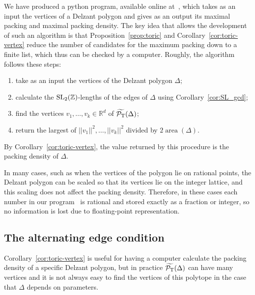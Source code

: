 \documentclass[pdftex]{sigma}
\numberwithin{equation}{section}
\def\R{{\mathbb R}}
\def\Z{{\mathbb Z}}
\newcommand{\De}{\Delta}
\newcommand{\area}{\operatorname{area}}
\newcommand{\PT}{\mathcal{P}_{\rm T}}
\newcommand{\PTtilde}{\widetilde{\PT}}
\newcommand{\SL}{{\rm SL}_2(\Z)}
\begin{document}
We have produced a python program, available online at~\cite{alg-url}, which takes as an input the vertices of a Delzant polygon and gives as an output its maximal packing and maximal packing density.
The key idea that allows the development of such an algorithm is that Proposition~\ref{prop:toric} and Corollary~\ref{cor:toric-vertex} reduce the number of candidates for the maximum packing down to a finite list, which thus can be checked by a computer.
Roughly, the algorithm follows these steps:
\begin{enumerate}\itemsep=0pt
 \item[(1)] take as an input the vertices of the Delzant polygon $\De$;
 \item[(2)] calculate the $\SL$-lengths of the edges of $\De$ using Corollary~\ref{cor:SL_gcd};
 \item[(3)] find the vertices $v_1,\ldots,v_k\in\R^d$ of $\PTtilde(\De)$;
 \item[(4)] return the largest of $||v_1||^2,\ldots,||v_k||^2$ divided by $2\area(\De)$.
\end{enumerate}
By Corollary~\ref{cor:toric-vertex}, the value returned by this procedure is the packing density of $\De$.

In many cases, such as when the vertices of the polygon lie on rational points, the Delzant polygon can be scaled so that its vertices lie on the integer lattice, and this scaling does not affect the packing density.
Therefore, in these cases each number in our program~\cite{alg-url} is rational and stored exactly as a fraction or integer, so no information is lost due to floating-point representation.






\subsection{The alternating edge condition}
Corollary~\ref{cor:toric-vertex} is useful for having a computer calculate the packing density of a specific Delzant polygon, but in practice $\PTtilde(\De)$ can have many vertices and it is not always easy to find the vertices of this polytope in the case that $\De$ depends on parameters.
\end{document}
